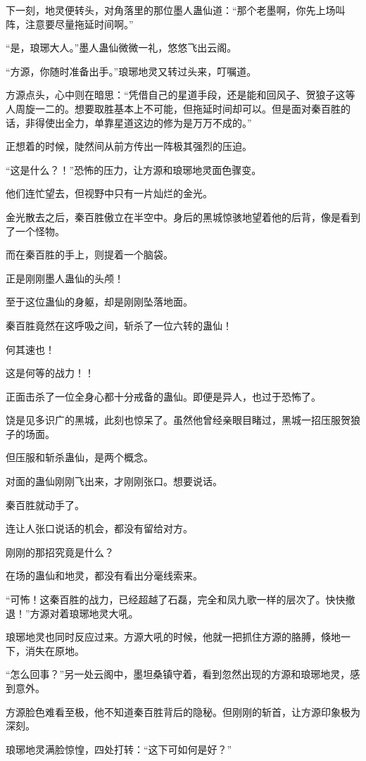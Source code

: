 \begin{this_body}
下一刻，地灵便转头，对角落里的那位墨人蛊仙道：“那个老墨啊，你先上场叫阵，注意要尽量拖延时间啊。”

“是，琅琊大人。”墨人蛊仙微微一礼，悠悠飞出云阁。

“方源，你随时准备出手。”琅琊地灵又转过头来，叮嘱道。

方源点头，心中则在暗思：“凭借自己的星道手段，还是能和回风子、贺狼子这等人周旋一二的。想要取胜基本上不可能，但拖延时间却可以。但是面对秦百胜的话，非得使出全力，单靠星道这边的修为是万万不成的。”

正想着的时候，陡然间从前方传出一阵极其强烈的压迫。

“这是什么？！”恐怖的压力，让方源和琅琊地灵面色骤变。

他们连忙望去，但视野中只有一片灿烂的金光。

金光散去之后，秦百胜傲立在半空中。身后的黑城惊骇地望着他的后背，像是看到了一个怪物。

而在秦百胜的手上，则提着一个脑袋。

正是刚刚墨人蛊仙的头颅！

至于这位蛊仙的身躯，却是刚刚坠落地面。

秦百胜竟然在这呼吸之间，斩杀了一位六转的蛊仙！

何其速也！

这是何等的战力！！

正面击杀了一位全身心都十分戒备的蛊仙。即便是异人，也过于恐怖了。

饶是见多识广的黑城，此刻也惊呆了。虽然他曾经亲眼目睹过，黑城一招压服贺狼子的场面。

但压服和斩杀蛊仙，是两个概念。

对面的蛊仙刚刚飞出来，才刚刚张口。想要说话。

秦百胜就动手了。

连让人张口说话的机会，都没有留给对方。

刚刚的那招究竟是什么？

在场的蛊仙和地灵，都没有看出分毫线索来。

“可怖！这秦百胜的战力，已经超越了石磊，完全和凤九歌一样的层次了。快快撤退！”方源对着琅琊地灵大吼。

琅琊地灵也同时反应过来。方源大吼的时候，他就一把抓住方源的胳膊，倏地一下，消失在原地。

“怎么回事？”另一处云阁中，墨坦桑镇守着，看到忽然出现的方源和琅琊地灵，感到意外。

方源脸色难看至极，他不知道秦百胜背后的隐秘。但刚刚的斩首，让方源印象极为深刻。

琅琊地灵满脸惊惶，四处打转：“这下可如何是好？”


\end{this_body}
